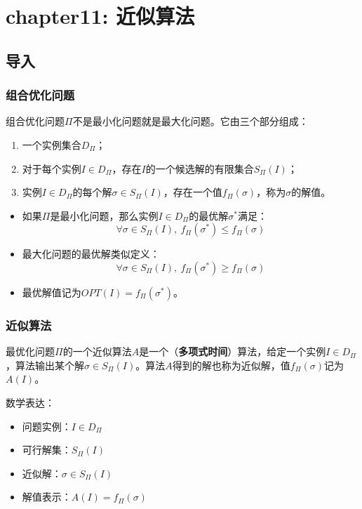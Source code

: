 \documentclass[./../main.tex]{subfiles} %
\begin{document}
\section{chapter11: 近似算法}

\subsection{导入}
\subsubsection{组合优化问题}

组合优化问题$\Pi$不是最小化问题就是最大化问题。它由三个部分组成：
\begin{enumerate}
    \item 一个实例集合$D_{\Pi}$；
    \item 对于每个实例$I \in D_{\Pi}$，存在$I$的一个候选解的有限集合$S_{\Pi}(I)$；
    \item 实例$I \in D_{\Pi}$的每个解$\sigma \in S_{\Pi}(I)$，存在一个值$f_{\Pi}(\sigma)$，称为$\sigma$的解值。
\end{enumerate}

\begin{itemize}
    \item 如果$\Pi$是最小化问题，那么实例$I \in D_{\Pi}$的最优解$\sigma^*$满足：
    $$
    \forall \sigma \in S_{\Pi}(I),\ f_{\Pi}(\sigma^*) \leq f_{\Pi}(\sigma)
    $$
    
    \item 最大化问题的最优解类似定义：
    $$
    \forall \sigma \in S_{\Pi}(I),\ f_{\Pi}(\sigma^*) \geq f_{\Pi}(\sigma)
    $$
    
    \item 最优解值记为$OPT(I) = f_{\Pi}(\sigma^*)$。
\end{itemize}

\subsubsection{近似算法}
最优化问题$\Pi$的一个近似算法$A$是一个（\textbf{多项式时间}）算法，给定一个实例$I \in D_{\Pi}$，算法输出某个解$\sigma \in S_{\Pi}(I)$。算法$A$得到的解也称为近似解，值$f_{\Pi}(\sigma)$记为$A(I)$。

数学表达：
\begin{itemize}
    \item 问题实例：$I \in D_{\Pi}$
    \item 可行解集：$S_{\Pi}(I)$
    \item 近似解：$\sigma \in S_{\Pi}(I)$
    \item 解值表示：$A(I) = f_{\Pi}(\sigma)$
\end{itemize}
\end{document}
